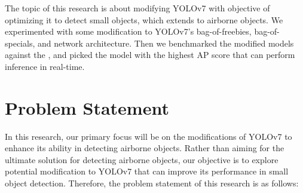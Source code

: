     The topic of this research is about modifying YOLOv7 with objective of optimizing it to detect
    small objects, which extends to airborne objects. We experimented with some modification to 
    YOLOv7's bag-of-freebies, bag-of-specials, and network architecture. Then we benchmarked the
    modified models against the \textcite{aot_dataset}, and picked the model with the highest AP score
    that can perform inference in real-time.





\section{Problem Statement}
    
    In this research, our primary focus will be on the modifications of YOLOv7 to enhance its ability in detecting airborne objects.
    Rather than aiming for the ultimate solution for detecting airborne objects, our objective is to explore potential modification to YOLOv7 that can improve its performance in small object detection. 
    Therefore, the problem statement of this research is as follows:

